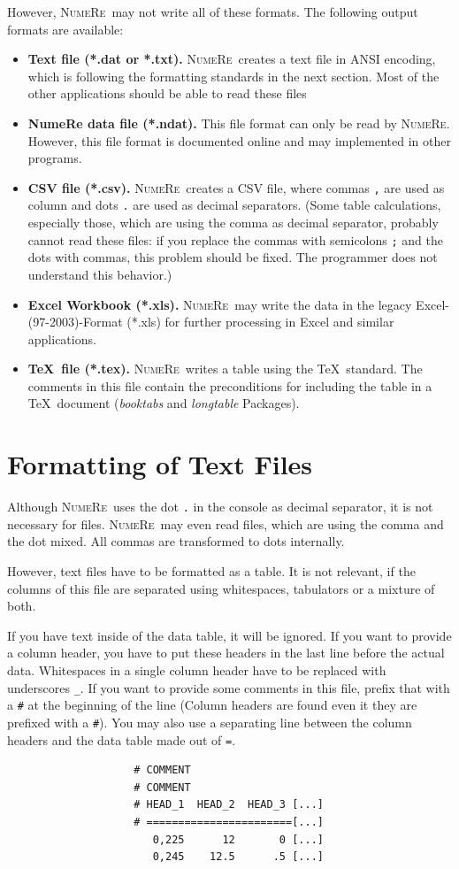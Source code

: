 \documentclass[DIV=14,headsepline,footsepline]{scrbook}
\newcommand{\NR}{\textsc{Nu\-me\-Re}}
\begin{document}
				However, \NR\ may not write all of these formats. The following output formats are available:
				\begin{itemize}
					\item \textbf{Text file (*.dat or *.txt).} \NR\ creates a text file in ANSI encoding, which is following the formatting standards in the next section. Most of the other applications should be able to read these files
					\item \textbf{NumeRe  data file (*.ndat).} This file format can only be read by \NR. However, this file format is documented online and may implemented in other programs.
					\item \textbf{CSV file (*.csv).} \NR\ creates a CSV file, where commas \lstinline+,+ are used as column and dots \lstinline+.+ are used as decimal separators. (Some table calculations, especially those, which are using the comma as decimal separator, probably cannot read these files: if you replace the commas with semicolons \lstinline+;+ and the dots with commas, this problem should be fixed. The programmer does not understand this behavior.)
					\item \textbf{Excel Workbook (*.xls).} \NR\ may write the data in the legacy Excel-(97-2003)-Format (*.xls) for further processing in Excel and similar applications.
					\item \textbf{\TeX\ file (*.tex).} \NR\ writes a table using the \TeX\ standard. The comments in this file contain the preconditions for including the table in a \TeX\ document (\emph{booktabs} and \emph{longtable} Packages).
				\end{itemize}
				
			\section{Formatting of Text Files}
				Although \NR\ uses the dot \lstinline+.+ in the console as decimal separator, it is not necessary for files. \NR\ may even read files, which are using the comma and the dot mixed. All commas are transformed to dots internally.
				
				However, text files have to be formatted as a table. It is not relevant, if the columns of this file are separated using whitespaces, tabulators or a mixture of both.
				
				If you have text inside of the data table, it will be ignored. If you want to provide a column header, you have to put these headers in the last line before the actual data. Whitespaces in a single column header have to be replaced with underscores \lstinline+_+. If you want to provide some comments in this file, prefix that with a \lstinline+#+ at the beginning of the line (Column headers are found even it they are prefixed with a \lstinline+#+). You may also use a separating line between the column headers and the data table made out of \lstinline+=+.
				\begin{verbatim}
					# COMMENT
					# COMMENT
					# HEAD_1  HEAD_2  HEAD_3 [...]
					# =======================[...]
					   0,225      12       0 [...]
					   0,245    12.5      .5 [...]
				\end{verbatim}
				
\end{document}
